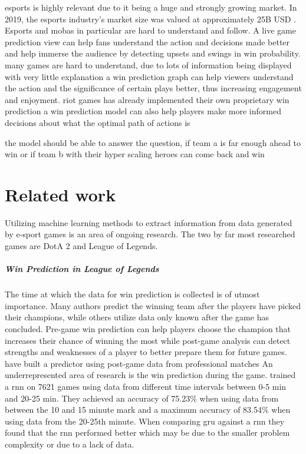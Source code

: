 \documentclass[12pt, a4paper, headinclude, twoside, plainheadsepline, open=right, numbers=noenddot, hidelinks, toc=listof, toc=bibliography]{scrreprt}
\begin{document}
esports is highly relevant due to it being a huge and strongly growing market.
In 2019, the esports industry's market size was valued at approximately 25B USD \cite{ahnOneBillionDollar2020}.
Esports and mobas in particular are hard to understand and follow. A live game prediction view can help fans understand the action and decisions made better and help immerse the audience by detecting upsets and swings in win probability.
many games are hard to understand, due to lots of information being displayed with very little explanation
a win prediction graph can help viewers understand the action and the significance of certain plays better, thus increasing engagement and enjoyment.
riot games has already implemented their own proprietary win prediction
a win prediction model can also help players make more informed decisions about what the optimal path of actions is

the model should be able to answer the question, if team a is far enough ahead to win or if team b with their hyper scaling heroes can come back and win


\chapter{Related work}
\label{chap:related}

Utilizing machine learning methods to extract information from data generated by e-sport games is an area of ongoing research.
The two by far most researched games are DotA 2 and League of Legends.
\paragraph{Win Prediction in League of Legends}
The time at which the data for win prediction is collected is of utmost importance.
Many authors predict the winning team after the players have picked their champions, while others utilize data only known after the game has concluded.
Pre-game win prediction can help players choose the champion that increases their chance of winning the most while post-game analysis can detect strengths and weaknesses of a player to better prepare them for future games.
\citeauthor{bahrololloomiESportsPlayerPerformance2023} \cite{bahrololloomiESportsPlayerPerformance2023} have built a predictor using post-game data from professional matches
An underrepresented area of research is the win prediction during the game.
 \cite{silvaContinuousOutcomePrediction2018} trained a \acf{rnn} on 7621 games using data from different time intervals between 0-5 min and 20-25 min.
They achieved an accuracy of 75.23\% when using data from between the 10 and 15 minute mark and a maximum accuracy of 83.54\% when using data from the 20-25th minute.
When comparing \ac{gru} against a \ac{rnn} they found that the \ac{rnn} performed better which may be due to the smaller problem complexity or due to a lack of data.
\end{document}
